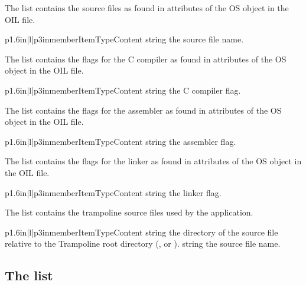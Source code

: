 The  list contains the source files as found in attributes  of the OS object in the OIL file.

\begin{longtableiii}{p{1.6in}|l|p{3in}}{member}{Item}{Type}{Content}
  {string}
  {the source file name.}
\end{longtableiii}

The  list contains the flags for the C compiler as found in attributes  of the OS object in the OIL file.

\begin{longtableiii}{p{1.6in}|l|p{3in}}{member}{Item}{Type}{Content}
  {string}
  {the C compiler flag.}
\end{longtableiii}

The  list contains the flags for the assembler as found in attributes  of the OS object in the OIL file.

\begin{longtableiii}{p{1.6in}|l|p{3in}}{member}{Item}{Type}{Content}
  {string}
  {the assembler flag.}
\end{longtableiii}

The  list contains the flags for the linker as found in attributes  of the OS object in the OIL file.

\begin{longtableiii}{p{1.6in}|l|p{3in}}{member}{Item}{Type}{Content}
  {string}
  {the linker flag.}
\end{longtableiii}

The  list contains the trampoline source files used by the application.

\begin{longtableiii}{p{1.6in}|l|p{3in}}{member}{Item}{Type}{Content}
  {string}
  {the directory of the source file relative to the Trampoline root directory (,  or ).}
  {string}
  {the source file name.}
\end{longtableiii}


\subsection{The  list}

